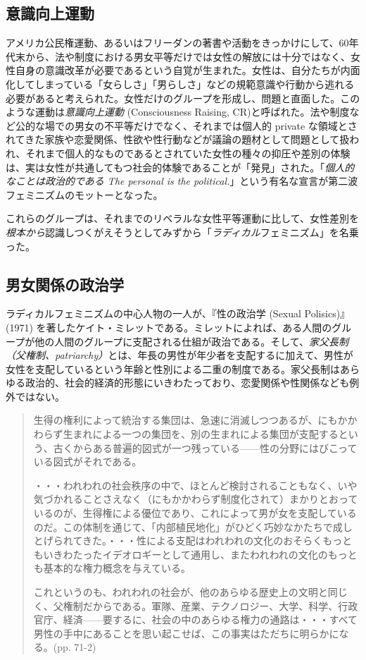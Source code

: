 \documentclass[dvipdfmx,uplatex]{jsarticle}
\begin{document}
\subsection{意識向上運動}

アメリカ公民権運動、あるいはフリーダンの著書や活動をきっかけにして、60年代末から、法や制度における男女平等だけでは女性の解放には十分ではなく、女性自身の意識改革が必要であるという自覚が生まれた。女性は、自分たちが内面化してしまっている「女らしさ」「男らしさ」などの規範意識や行動から逃れる必要があると考えられた。女性だけのグループを形成し、問題と直面した。このような運動は\emph{意識向上運動} (Consciousness Raising, CR)と呼ばれた。法や制度など公的な場での男女の不平等だけでなく、それまでは個人的 private な領域とされてきた家族や恋愛関係、性欲や性行動などが議論の題材として問題として扱われ、それまで個人的なものであるとされていた女性の種々の抑圧や差別の体験は、実は女性が共通してもつ社会的体験であることが「発見」された。「\emph{個人的なことは政治的である The personal is the political.}」という有名な宣言が第二波フェミニズムのモットーとなった。

これらのグループは、それまでのリベラルな女性平等運動に比して、女性差別を\emph{根本から}認識しつくがえそうとしてみずから「\emph{ラディカル}フェミニズム」を名乗った。


\subsection{男女関係の政治学}

ラディカルフェミニズムの中心人物の一人が、『性の政治学 (Sexual Polisics)』(1971) \citep{millett70:_sexual_politics}を著したケイト・ミレットである。ミレットによれば、ある人間のグループが他の人間のグループに支配される仕組が政治である。そして、\emph{家父長制（父権制、patriarchy）}とは、年長の男性が年少者を支配するに加えて、男性が女性を支配しているという年齢と性別による二重の制度である。家父長制はあらゆる政治的、社会的経済的形態にいきわたっており、恋愛関係や性関係なども例外ではない。

\begin{quotation}
  生得の権利によって統治する集団は、急速に消滅しつつあるが、にもかかわらず生まれによる一つの集団を、別の生まれによる集団が支配するという、古くからある普遍的図式が一つ残っている——性の分野にはびこっている図式がそれである。

  ・・・われわれの社会秩序の中で、ほとんど検討されることもなく、いや気づかれることさえなく（にもかかわらず制度化されて）まかりとおっているのが、生得権による優位であり、これによって男が女を支配しているのだ。この体制を通じて、「内部植民地化」がひどく巧妙なかたちで成しとげられてきた。・・・性による支配はわれわれの文化のおそらくもっともいきわたったイデオロギーとして通用し、またわれわれの文化のもっとも基本的な権力概念を与えている。

  これというのも、われわれの社会が、他のあらゆる歴史上の文明と同じく、父権制だからである。軍隊、産業、テクノロジー、大学、科学、行政官庁、経済——要するに、社会の中のあらゆる権力の通路は・・・すべて男性の手中にあることを思い起こせば、この事実はただちに明らかになる。(pp. 71-2)

\end{quotation}
\end{document}
